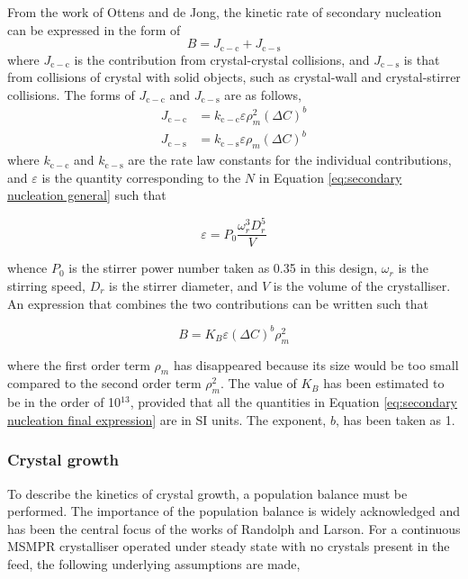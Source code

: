 From the work of Ottens and de Jong, \cite{ottens_model_1974} the kinetic rate of secondary nucleation can be expressed in the form of 
\begin{equation}
    B = J_{\mathrm{c-c}} + J_{\mathrm{c-s}}
\end{equation}
 where $J_{\mathrm{c-c}}$ is the contribution from crystal-crystal collisions, and $J_{\mathrm{c-s}}$ is that from collisions of crystal with solid objects, such as crystal-wall and crystal-stirrer collisions. The forms of $J_{\mathrm{c-c}}$ and $J_{\mathrm{c-s}}$ are as follows,
\begin{align}
    J_{\mathrm{c-c}} &= k_{\mathrm{c-c}} \varepsilon \rho_m^2 (\Delta C)^b \\
    J_{\mathrm{c-s}} &= k_{\mathrm{c-s}} \varepsilon \rho_m (\Delta C)^b
\end{align}
where $k_{\mathrm{c-c}}$ and $k_{\mathrm{c-s}}$ are the rate law constants for the individual contributions, and $\varepsilon$ is the quantity corresponding to the $N$ in Equation \ref{eq:secondary nucleation general} such that 

\begin{equation}
    \varepsilon = P_0 \frac{\omega_r^3 D_r^5}{V} 
\end{equation}

\noindent whence $P_0$ is the stirrer power number taken as 0.35 in this design, $\omega_r$ is the stirring speed, $D_r$ is the stirrer diameter, and $V$ is the volume of the crystalliser. An expression that combines the two contributions can be written such that 

\begin{equation} \label{eq:secondary nucleation final expression}
    B = K_B \varepsilon (\Delta C)^b \rho_m^2
\end{equation}

\noindent where the first order term $\rho_m$ has disappeared because its size would be too small compared to the second order term $\rho_m^2$. The value of $K_B$ has been estimated to be in the order of 10$^{13}$, \cite{bauer_contact_1974} provided that all the quantities in Equation \ref{eq:secondary nucleation final expression} are in SI units. The exponent, $b$, has been taken as 1. 

\subsubsection{Crystal growth} \label{sec: crystal growth}

To describe the kinetics of crystal growth, a population balance must be performed. The importance of the population balance is widely acknowledged and has been the central focus of the works of Randolph and Larson. \cite{richardson_chemical_2006} \cite{randolph_theory_1971} For a continuous MSMPR crystalliser operated under steady state with no crystals present in the feed, the following underlying assumptions are made,

